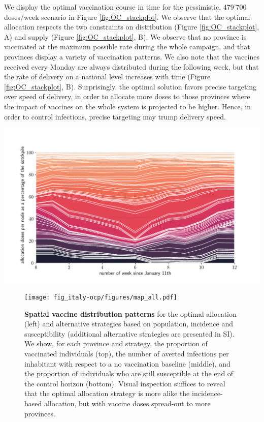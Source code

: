 We display the optimal vaccination course in time for the pessimistic, 479'700 doses/week scenario in Figure \ref{fig:OC_stackplot}. We observe that the optimal allocation respects the two constraints on distribution (Figure \ref{fig:OC_stackplot}, A) and supply (Figure \ref{fig:OC_stackplot}, B). We observe that no province is vaccinated at the maximum possible rate during the whole campaign, and that provinces display a variety of vaccination patterns. We also note that the vaccines received every Monday are always distributed during the following week, but that the rate of delivery on a national level increases with time (Figure \ref{fig:OC_stackplot}, B). Surprisingly, the optimal solution favors precise targeting over speed of delivery, in order to allocate more doses to those provinces where the impact of vaccines on the whole system is projected to be higher. Hence, in order to control infections, precise targeting may trump delivery speed. 
\begin{marginfigure}[-7\baselineskip]
    \centering
    \includegraphics{fig_italy-ocp/figuresSI/SI_ts_optimal_stackplot_proportional.pdf}
    \label{fig:OC_temporal_alloaction}
\end{marginfigure}

\begin{figure}[!ht]
    \centering
    \texttt{[image: fig\_italy-ocp/figures/map\_all.pdf]}
    \caption[Spatial  vaccine distribution patterns]{\textbf{Spatial  vaccine distribution patterns} for the optimal allocation (left) and alternative strategies based on population, incidence and susceptibility (additional alternative strategies are presented in SI). We show, for each province and strategy, the proportion of vaccinated individuals (top), the number of averted infections per inhabitant with respect to a no vaccination baseline (middle), and the proportion of individuals who are still susceptible at the end of the control horizon (bottom). Visual inspection suffices to reveal that the optimal allocation strategy is more alike the incidence-based allocation, but with vaccine doses spread-out to more provinces.}
    \label{fig:OC_multimap}
\end{figure}

